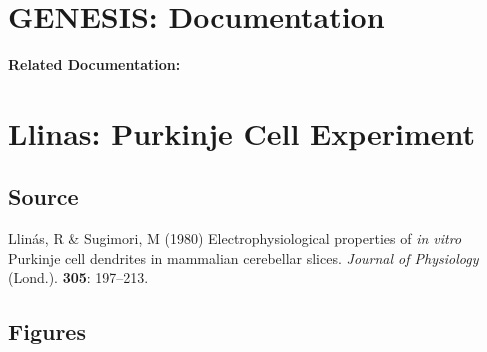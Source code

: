 \documentclass[12pt]{article}
\begin{document}
\section*{GENESIS: Documentation}

{\bf Related Documentation:}

\section*{Llinas: Purkinje Cell Experiment}

\subsection*{Source}

Llin\'as, R \& Sugimori, M (1980) Electrophysiological properties of {\it in vitro} Purkinje cell dendrites in mammalian cerebellar slices. {\it Journal of Physiology} (Lond.). {\bf 305}: 197--213.

\subsection*{Figures}

\setcounter {figure}{3}
\end{document}
